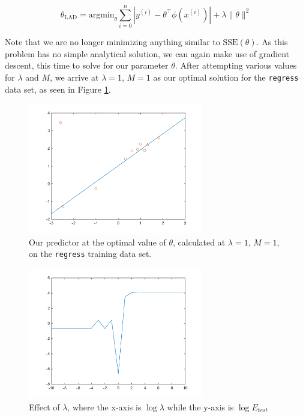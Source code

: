 \documentclass[10pt,letterpaper]{article}
\begin{document}
$$\theta_{\text{LAD}} = \text{argmin}_\theta\sum_{i=0}^n|y^{(i)} - \theta^\intercal\phi(x^{(i)})| + \lambda\lVert\theta\rVert^2$$

Note that we are no longer minimizing anything similar to $\text{SSE}(\theta)$. As this problem has no simple analytical solution, we can again make use of gradient descent, this time to solve for our parameter $\theta$. After attempting various values for $\lambda$ and $M$, we arrive at $\lambda = 1$, $M=1$ as our optimal solution for the \texttt{regress} data set, as seen in Figure \ref{fig:line}.

\begin{figure}[!htb]
\begin{center}
\includegraphics[width=3in]{figures/line.png}
\caption{Our predictor at the optimal value of $\theta$, calculated at $\lambda=1$, $M=1$, on the \texttt{regress} training data set.}\label{fig:line}
\end{center}
\end{figure}

\begin{figure}[!htb]
\begin{center}
\includegraphics[width=3in]{figures/lambdaline.png}
\caption{Effect of $\lambda$, where the x-axis is $\log \lambda$ while the y-axis is $\log E_{test}$}\label{fig:lambdaline}
\end{center}
\end{figure}
\end{document}
